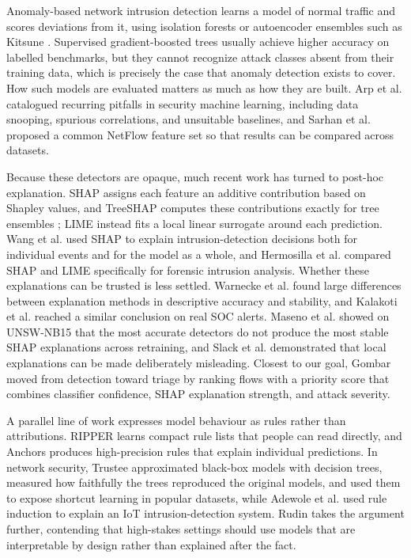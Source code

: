\documentclass[journal]{IEEEtran}
\begin{document}
Anomaly-based network intrusion detection learns a model of normal traffic and scores deviations from it, using isolation forests \cite{iforest} or autoencoder ensembles such as Kitsune \cite{kitsune}. Supervised gradient-boosted trees \cite{xgboost} usually achieve higher accuracy on labelled benchmarks, but they cannot recognize attack classes absent from their training data, which is precisely the case that anomaly detection exists to cover. How such models are evaluated matters as much as how they are built. Arp et al. \cite{arp} catalogued recurring pitfalls in security machine learning, including data snooping, spurious correlations, and unsuitable baselines, and Sarhan et al. \cite{sarhan} proposed a common NetFlow feature set so that results can be compared across datasets.

Because these detectors are opaque, much recent work has turned to post-hoc explanation. SHAP \cite{shap} assigns each feature an additive contribution based on Shapley values, and TreeSHAP computes these contributions exactly for tree ensembles \cite{treeshap}; LIME \cite{lime} instead fits a local linear surrogate around each prediction. Wang et al. \cite{wang} used SHAP to explain intrusion-detection decisions both for individual events and for the model as a whole, and Hermosilla et al. \cite{hermosilla} compared SHAP and LIME specifically for forensic intrusion analysis. Whether these explanations can be trusted is less settled. Warnecke et al. \cite{warnecke} found large differences between explanation methods in descriptive accuracy and stability, and Kalakoti et al. \cite{kalakoti} reached a similar conclusion on real SOC alerts. Maseno et al. \cite{maseno} showed on UNSW-NB15 that the most accurate detectors do not produce the most stable SHAP explanations across retraining, and Slack et al. \cite{fooling} demonstrated that local explanations can be made deliberately misleading. Closest to our goal, Gombar \cite{gombar} moved from detection toward triage by ranking flows with a priority score that combines classifier confidence, SHAP explanation strength, and attack severity.

A parallel line of work expresses model behaviour as rules rather than attributions. RIPPER \cite{ripper} learns compact rule lists that people can read directly, and Anchors \cite{anchors} produces high-precision rules that explain individual predictions. In network security, Trustee \cite{trustee} approximated black-box models with decision trees, measured how faithfully the trees reproduced the original models, and used them to expose shortcut learning in popular datasets, while Adewole et al. \cite{adewole} used rule induction to explain an IoT intrusion-detection system. Rudin \cite{rudin} takes the argument further, contending that high-stakes settings should use models that are interpretable by design rather than explained after the fact.
\end{document}
